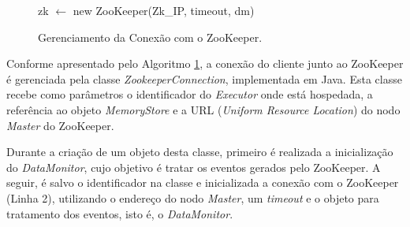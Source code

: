 \begin{figure}[!ht]
    \begin{algorithm}[H]
    \caption{Gerenciamento da Conexão com o ZooKeeper.}
        \label{fig:conexao-zookeeper}
    
            
             {
                zk $\leftarrow$ new ZooKeeper(Zk\_IP, timeout, dm)\; 
                
                
                \BlankLine
            }
    \end{algorithm}
\end{figure}


Conforme apresentado pelo Algoritmo \ref{fig:conexao-zookeeper}, a conexão do cliente junto ao ZooKeeper é gerenciada pela classe \textit{ZookeeperConnection}, implementada em Java. Esta classe recebe como parâmetros o identificador do \textit{Executor} onde está hospedada, a referência ao objeto \textit{MemoryStore} e a URL (\textit{Uniform Resource Location}) do nodo \textit{Master} do ZooKeeper. 

Durante a criação de um objeto desta classe, primeiro é realizada a inicialização do \textit{DataMonitor}, cujo objetivo é tratar os eventos gerados pelo ZooKeeper. A seguir, é salvo o identificador na classe e inicializada a conexão com o ZooKeeper (Linha 2), utilizando o endereço do nodo \textit{Master}, um \textit{timeout} e o objeto para tratamento dos eventos, isto é, o \textit{DataMonitor}.

